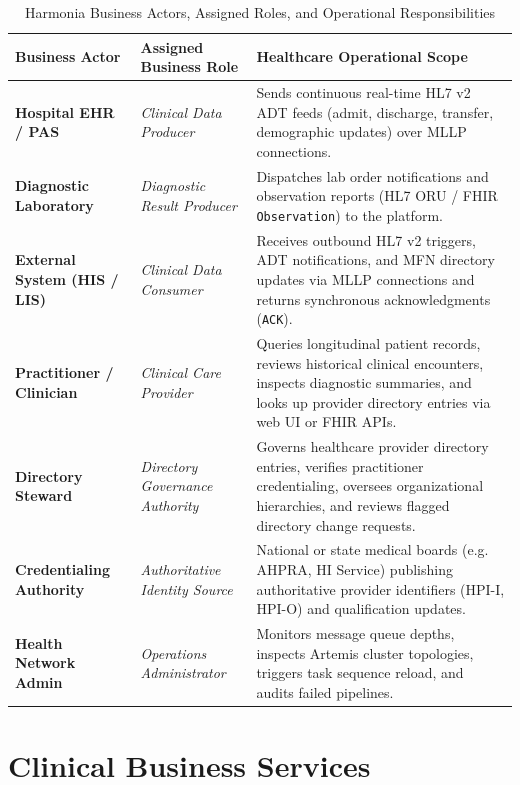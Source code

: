\begin{table}[htbp]
\centering
\small
\begin{tabularx}{\textwidth}{l p{4.0cm} X}
\toprule
\textbf{Business Actor} & \textbf{Assigned Business Role} & \textbf{Healthcare Operational Scope} \\
\midrule
\textbf{Hospital EHR / PAS} & \textit{Clinical Data Producer} & Sends continuous real-time HL7 v2 ADT feeds (admit, discharge, transfer, demographic updates) over MLLP connections. \\
\addlinespace
\textbf{Diagnostic Laboratory} & \textit{Diagnostic Result Producer} & Dispatches lab order notifications and observation reports (HL7 ORU / FHIR \texttt{Observation}) to the platform. \\
\addlinespace
\textbf{External System (HIS / LIS)} & \textit{Clinical Data Consumer} & Receives outbound HL7 v2 triggers, ADT notifications, and MFN directory updates via MLLP connections and returns synchronous acknowledgments (\texttt{ACK}). \\
\addlinespace
\textbf{Practitioner / Clinician} & \textit{Clinical Care Provider} & Queries longitudinal patient records, reviews historical clinical encounters, inspects diagnostic summaries, and looks up provider directory entries via web UI or FHIR APIs. \\
\addlinespace
\textbf{Directory Steward} & \textit{Directory Governance Authority} & Governs healthcare provider directory entries, verifies practitioner credentialing, oversees organizational hierarchies, and reviews flagged directory change requests. \\
\addlinespace
\textbf{Credentialing Authority} & \textit{Authoritative Identity Source} & National or state medical boards (e.g. AHPRA, HI Service) publishing authoritative provider identifiers (HPI-I, HPI-O) and qualification updates. \\
\addlinespace
\textbf{Health Network Admin} & \textit{Operations Administrator} & Monitors message queue depths, inspects Artemis cluster topologies, triggers task sequence reload, and audits failed pipelines. \\
\bottomrule
\end{tabularx}
\caption{Harmonia Business Actors, Assigned Roles, and Operational Responsibilities}
\label{tab:business_actors}
\end{table}

\section{Clinical Business Services}

